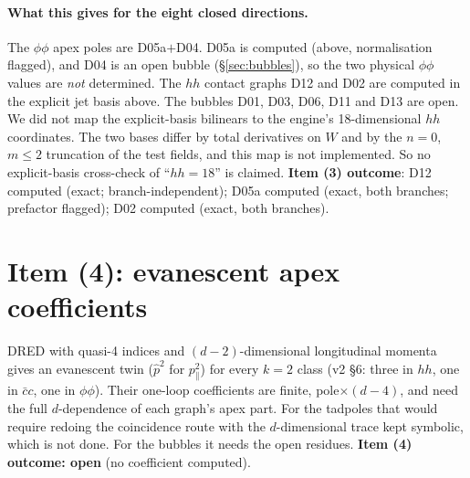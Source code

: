 \paragraph{What this gives for the eight closed directions.} The $\phi\phi$ apex poles are D05a$+$D04. D05a is computed (above, normalisation flagged), and D04 is an open bubble (\S\ref{sec:bubbles}), so the two physical $\phi\phi$ values are \emph{not} determined. The $hh$ contact graphs D12 and D02 are computed in the explicit jet basis above. The bubbles D01, D03, D06, D11 and D13 are open. We did not map the explicit-basis bilinears to the engine's 18-dimensional $hh$ coordinates. The two bases differ by total derivatives on $W$ and by the $n=0$, $m\le2$ truncation of the test fields, and this map is not implemented. So no explicit-basis cross-check of ``$hh=18$'' is claimed.
\textbf{Item (3) outcome}: D12 computed (exact; branch-independent); D05a computed (exact, both branches; prefactor flagged); D02 computed (exact, both branches).

\section{Item (4): evanescent apex coefficients}
DRED with quasi-4 indices and $(d-2)$-dimensional longitudinal momenta gives an evanescent twin ($\hat p^2$ for $p_\parallel^2$) for every $k=2$ class (v2 \S6: three in $hh$, one in $\bar cc$, one in $\phi\phi$). Their one-loop coefficients are finite, pole$\times(d-4)$, and need the full $d$-dependence of each graph's apex part. For the tadpoles that would require redoing the coincidence route with the $d$-dimensional trace kept symbolic, which is not done. For the bubbles it needs the open residues. \textbf{Item (4) outcome: open} (no coefficient computed).

